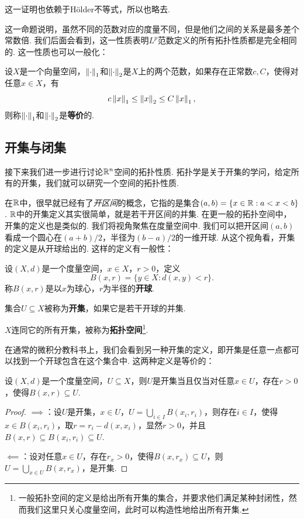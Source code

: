 这一证明也依赖于H\"older不等式，所以也略去. 

这一命题说明，虽然不同的范数对应的度量不同，但是他们之间的关系是最多差个常数倍. 我们后面会看到，这一性质表明$L^p$范数定义的所有拓扑性质都是完全相同的. 这一性质也可以一般化：

\begin{definition}[等价范数]
    设$X$是一个向量空间，$\left\|\cdot\right\|_1$和$\left\|\cdot\right\|_2$是$X$上的两个范数，如果存在正常数$c,C$，使得对任意$x\in X$，有
    \[c\left\|x\right\|_1\leq \left\|x\right\|_2\leq C\left\|x\right\|_1,\]
    则称$\left\|\cdot\right\|_1$和$\left\|\cdot\right\|_2$是\textbf{等价}的. 
\end{definition}

\subsection{开集与闭集}

接下来我们进一步进行讨论$\mathbb{R}^n$空间的拓扑性质. 拓扑学是关于开集的学问，给定所有的开集，我们就可以研究一个空间的拓扑性质. 

在$\mathbb{R}$中，很早就已经有了\textit{开区间}的概念，它指的是集合$(a,b)=\{x\in\mathbb{R}:a<x<b\}$. $\mathbb{R}$中的开集定义其实很简单，就是若干开区间的并集. 在更一般的拓扑空间中，开集的定义也是类似的. 我们将视角聚焦在度量空间中. 我们可以把开区间$(a,b)$看成一个圆心在$(a+b)/2$，半径为$(b-a)/2$的一维开球. 从这个视角看，开集的定义是从开球给出的. 这样的定义有一般性：

\begin{definition}[开球，开集，拓扑空间]
    设$(X,d)$是一个度量空间，$x\in X$，$r>0$，定义
    \[B(x,r)=\{y\in X:d(x,y)<r\}.\]
    称$B(x,r)$是以$x$为球心，$r$为半径的\textbf{开球}. 
    
    集合$U\subseteq X$被称为\textbf{开集}，如果它是若干开球的并集. 

    $X$连同它的所有开集，被称为\textbf{拓扑空间}\footnote{一般拓扑空间的定义是给出所有开集的集合，并要求他们满足某种封闭性，然而我们这里只关心度量空间，此时可以构造性地给出所有开集. }. 
\end{definition}

在通常的微积分教科书上，我们会看到另一种开集的定义，即开集是任意一点都可以找到一个开球包含在这个集合中. 这两种定义是等价的：

\begin{proposition}\label{proposition:open-ball}
    设$(X,d)$是一个度量空间，$U\subseteq X$，则$U$是开集当且仅当对任意$x\in U$，存在$r>0$，使得$B(x,r)\subseteq U$.
\end{proposition}
\begin{proof}
   $\implies$：设$U$是开集，$x\in U$，$U=\bigcup_{i\in I}B(x_i,r_i)$，则存在$i\in I$，使得$x\in B(x_i,r_i)$，取$r=r_i-d(x,x_i)$，显然$r>0$，并且$B(x,r)\subseteq B(x_i,r_i)\subseteq U$.

    $\impliedby$：设对任意$x\in U$，存在$r_x>0$，使得$B(x,r_x)\subseteq U$，则$U=\bigcup_{x\in U}B(x,r_x)$，是开集. 
\end{proof}

